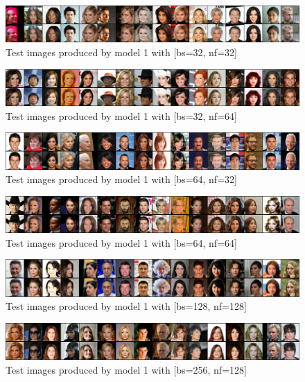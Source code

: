 \documentclass{article}
\begin{document}
\begin{multicols}{2}
\printbibliography

\end{multicols}


\begin{figure}[p]	
	\vspace{1cm}
	\centering 
	\includegraphics[width=0.95\linewidth]{figures/bs32_nf32}
	\caption{Test images produced by model 1 with [bs=32, nf=32]}
	\label{fig:imgs_bs32_nf32}
\end{figure}
\begin{figure}[p]
	\centering 
	\includegraphics[width=0.95\linewidth]{figures/bs32_nf64}
	\caption{Test images produced by model 1 with [bs=32, nf=64]}
	\label{fig:imgs_bs32_nf64}
\end{figure}
\begin{figure}[p]
	\centering 
	\includegraphics[width=0.95\linewidth]{figures/bs64_nf32}
	\caption{Test images produced by model 1 with [bs=64, nf=32]}
	\label{fig:imgs_bs64_nf32}
\end{figure}
\begin{figure}[p]
	\centering 
	\includegraphics[width=0.95\linewidth]{figures/bs64_nf64}
	\caption{Test images produced by model 1 with [bs=64, nf=64]}
	\label{fig:imgs_bs64_nf64}
\end{figure}
\begin{figure}[p]
	\centering 
	\includegraphics[width=0.95\linewidth]{figures/bs128_nf128}
	\caption{Test images produced by model 1 with [bs=128, nf=128]}
	\label{fig:imgs_bs128_nf128}
\end{figure}
\begin{figure}[p]
	\centering 
	\includegraphics[width=0.95\linewidth]{figures/bs256_nf128}
	\caption{Test images produced by model 1 with [bs=256, nf=128]}
	\label{fig:imgs_bs256_nf128}
\end{figure}
\end{document}
